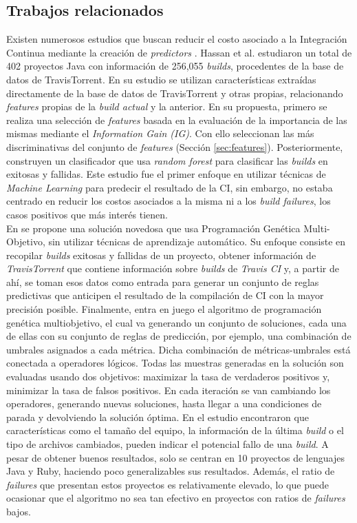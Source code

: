 \subsection{Trabajos relacionados} \label{sec:related_work}
Existen numerosos estudios que buscan reducir el costo asociado a la Integración Continua
mediante la creación de \textit{predictors} \cite{7,5,2,15,6,14,4,1,19}. Hassan et al. \cite{7}
estudiaron un total de 402 proyectos Java con información de 256,055 \textit{builds}, procedentes
de la base de datos de TravisTorrent. En su estudio se utilizan características extraídas
directamente de la base de datos de TravisTorrent y otras propias, relacionando \textit{features}
propias de la \textit{build actual} y la anterior. En su propuesta, primero se realiza una
selección de \textit{features} basada en la evaluación de la importancia de las mismas mediante
el \textit{Information Gain (IG)}. Con ello seleccionan las más discriminativas del conjunto de
\textit{features} (Sección \ref{sec:features}). Posteriormente, construyen un clasificador que usa
\textit{random forest} para clasificar las \textit{builds} en exitosas y fallidas. Este estudio
fue el primer enfoque en utilizar técnicas de \textit{Machine Learning} para predecir el resultado
de la CI, sin embargo, no estaba centrado en reducir los costos asociados a la misma ni
a los \textit{build failures}, los casos positivos que más interés tienen.\\

En \cite{5} se propone una solución novedosa que usa Programación Genética Multi-Objetivo, sin
utilizar técnicas de aprendizaje automático. Su enfoque consiste en recopilar \textit{builds}
exitosas y fallidas de un proyecto, obtener información de \textit{TravisTorrent} que contiene
información sobre \textit{builds} de \textit{Travis CI} y, a partir de ahí, se toman esos datos
como entrada para generar un conjunto de reglas predictivas que anticipen el resultado de la
compilación de CI con la mayor precisión posible. Finalmente, entra en juego el 
algoritmo de programación genética multiobjetivo, el cual va generando un conjunto de soluciones, 
cada una de ellas con su conjunto de reglas de predicción, por ejemplo, una combinación de
umbrales asignados a cada métrica. Dicha combinación de métricas-umbrales está conectada a
operadores lógicos. Todas las muestras generadas en la solución son evaluadas usando dos
objetivos: maximizar la tasa de verdaderos positivos y, minimizar la tasa de falsos positivos.
En cada iteración se van cambiando los operadores, generando nuevas soluciones, hasta llegar a
una condiciones de parada y devolviendo la solución óptima. En el estudio encontraron que
características como el tamaño del equipo, la información de la última \textit{build} o el tipo
de archivos cambiados, pueden indicar el potencial fallo de una \textit{build}. A pesar de
obtener buenos resultados, solo se centran en 10 proyectos de lenguajes Java y Ruby, haciendo
poco generalizables sus resultados. Además, el ratio de \textit{failures} que presentan estos
proyectos es relativamente elevado, lo que puede ocasionar que el algoritmo no sea tan efectivo
en proyectos con ratios de \textit{failures} bajos.\\

